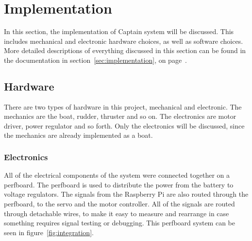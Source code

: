 \chapter{Implementation}
In this section, the implementation of Captain system will be discussed. This includes mechanical and electronic hardware choices, as well as software choices.
More detailed descriptions of everything discussed in this section can be found in the documentation in section~\ref{sec:implementation}, on page~\pageref{sec:implementation}.

\section{Hardware}
There are two types of hardware in this project, mechanical and electronic. The mechanics are the boat, rudder, thruster and so on. The electronics are motor driver, power regulator and so forth. Only the electronics will be discussed, since the mechanics are already implemented as a boat.

\subsection{Electronics}
All of the electrical components of the system were connected together on a perfboard\cite{perfboard}. The perfboard is used to distribute the power from the battery to voltage regulators. The signals from the Raspberry Pi are also routed through the perfboard, to the servo and the motor controller. All of the signals are routed through detachable wires, to make it easy to measure and rearrange in case something requires signal testing or debugging. This perfboard system can be seen in figure~\ref{fig:integration}. 

